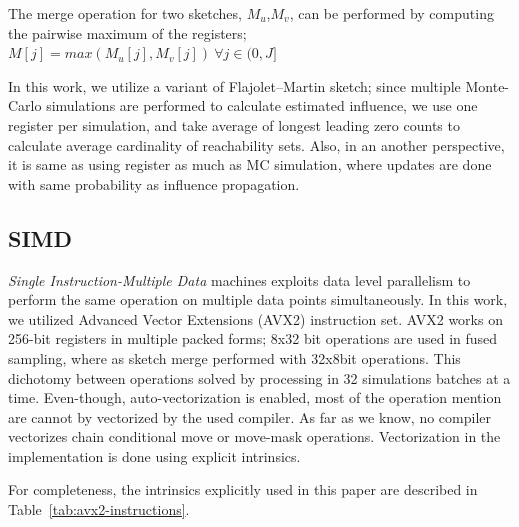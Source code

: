 \documentclass[10pt,journal,compsoc]{IEEEtran}
\begin{document}
The merge operation for two sketches, $M_u$,$M_v$, can be performed by computing the pairwise maximum of the registers; $M[j] = max(M_u[j],M_v[j]) ~ \forall j\in(0,J]$

In this work, we utilize a variant of Flajolet–Martin sketch; since multiple Monte-Carlo simulations are performed to calculate estimated influence, we use one register per simulation, and take average of longest leading zero counts to calculate average cardinality of reachability sets. Also, in an another perspective, it is same as using register as much as MC simulation, where updates are done with same probability as influence propagation. 


\subsection{SIMD}
{\em Single Instruction-Multiple Data} machines exploits data level parallelism to perform the same operation on multiple data points simultaneously. In this work, we utilized Advanced Vector Extensions (AVX2) instruction set. AVX2 works on 256-bit registers in multiple packed forms; 8x32 bit operations are used in fused sampling, where as sketch merge  performed with 32x8bit operations. This dichotomy between operations solved by processing in 32 simulations batches at a time.
Even-though, auto-vectorization is enabled, most of the operation mention are cannot by vectorized by the used compiler. As far as we know, no compiler vectorizes chain conditional move or move-mask operations. Vectorization in the implementation is done using explicit intrinsics.



For completeness, the intrinsics explicitly used in this paper are described in Table~\ref{tab:avx2-instructions}.
\end{document}
